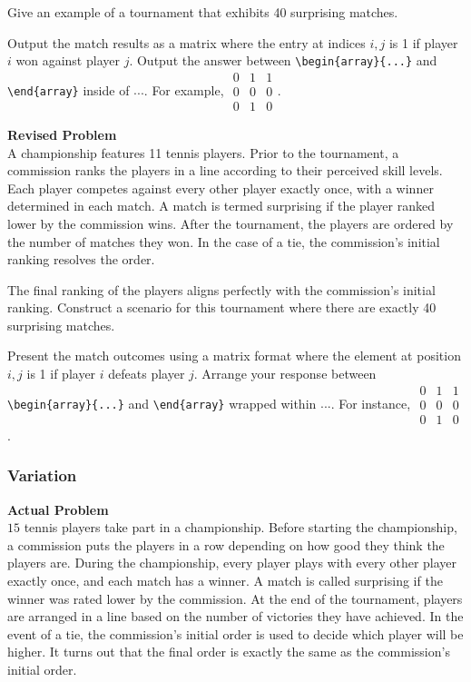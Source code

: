 Give an example of a tournament that exhibits 40 surprising matches.

Output the match results as a matrix where the entry at indices $i,j$ is 1 if player $i$ won against player $j$. Output the answer between \verb|\begin{array}{...}| and \verb|\end{array}| inside of $\boxed{...}$. For example, $\boxed{\begin{array}{ccc}0 & 1 & 1 \\ 0 & 0 & 0 \\ 0 & 1 & 0\end{array}}$.

\textbf{Revised Problem}\\
A championship features 11 tennis players. Prior to the tournament, a commission ranks the players in a line according to their perceived skill levels. Each player competes against every other player exactly once, with a winner determined in each match. A match is termed surprising if the player ranked lower by the commission wins. After the tournament, the players are ordered by the number of matches they won. In the case of a tie, the commission's initial ranking resolves the order.

The final ranking of the players aligns perfectly with the commission's initial ranking. Construct a scenario for this tournament where there are exactly 40 surprising matches.

Present the match outcomes using a matrix format where the element at position $i,j$ is 1 if player $i$ defeats player $j$. Arrange your response between \verb|\begin{array}{...}| and \verb|\end{array}| wrapped within $\boxed{...}$. For instance, $\boxed{\begin{array}{ccc}0 & 1 & 1 \\ 0 & 0 & 0 \\ 0 & 1 & 0\end{array}}$.

\subsubsection{Variation}
\textbf{Actual Problem}\\
$15$ tennis players take part in a championship. Before starting the championship, a commission puts the players in a row depending on how good they think the players are. During the championship, every player plays with every other player exactly once, and each match has a winner. A match is called surprising if the winner was rated lower by the commission. At the end of the tournament, players are arranged in a line based on the number of victories they have achieved. In the event of a tie, the commission's initial order is used to decide which player will be higher.
It turns out that the final order is exactly the same as the commission's initial order. 

